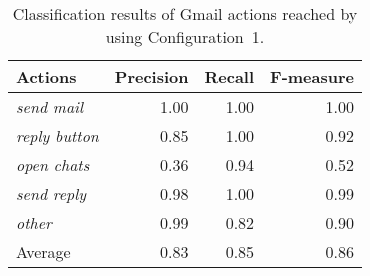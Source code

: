 \documentclass{acm_proc_article-sp}
\begin{document}
\begin{table}[t]
\begin{center} {\begin{tabular}{|l|r|r|r|}
    \hline
\textbf{Actions} & \textbf{Precision}& \textbf{Recall} & 
\textbf{F-measure}\\
    \hline
 \emph{send mail} &      1.00   &   1.00 &     1.00 \\
\emph{reply button}    &   0.85    &  1.00   &   0.92 \\
  \emph{open chats}    &   0.36    &  0.94  &    0.52 \\
\emph{send reply} &      0.98   &   1.00   &   0.99 \\
\emph{other}   &    0.99  &    0.82   &   0.90  \\
\hline
Average    &   0.83   &   0.85  &    0.86  \\ \hline
\end{tabular} }
\end{center}
\caption{Classification results of Gmail actions reached by using {Configuration~1}.}
\label{tab:gmailreport}
\end{table}
\end{document}
